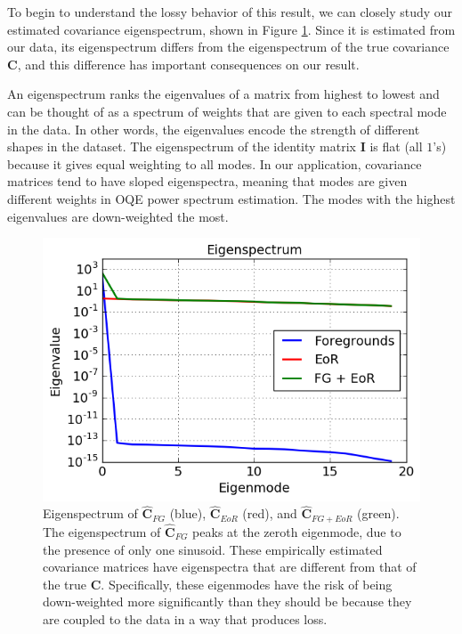 \documentclass[preprint2,numberedappendix,tighten]{aastex6}  %
\begin{document}
To begin to understand the lossy behavior of this result, we can closely study our estimated covariance eigenspectrum, shown in Figure \ref{fig:toy_sigloss2}. Since it is estimated from our data, its eigenspectrum differs from the eigenspectrum of the true covariance $\textbf{C}$, and this difference has important consequences on our result. 

An eigenspectrum ranks the eigenvalues of a matrix from 
highest to lowest and can be thought of as a spectrum of weights that are given to each spectral mode in the data. In other 
words, the eigenvalues encode the strength of different shapes in the dataset. The eigenspectrum of the identity matrix $
\textbf{I}$ is flat (all $1$'s) because it gives equal weighting to all modes. In our application, covariance matrices tend to have sloped eigenspectra, meaning that modes are given different weights in OQE power spectrum estimation. The modes with the highest eigenvalues are 
down-weighted the most. 

\begin{figure}
	\centering
	\includegraphics[trim={0cm 0cm 0cm 0cm},clip,width=\columnwidth]{plots/toy_sigloss2.png}
	\caption{Eigenspectrum of $\widehat{\textbf{C}}_{FG}$ (blue), $\widehat{\textbf{C}}_{EoR}$ (red), and $\widehat{\textbf{C}}_{FG+EoR}$ 
(green). The eigenspectrum of $\widehat{\textbf{C}}_{FG}$ peaks at the zeroth eigenmode, due to the presence of only one 
sinusoid. These empirically estimated covariance matrices have eigenspectra that are different from that of the true $\textbf{C}$. Specifically, these eigenmodes have the risk of being down-weighted more significantly than they should be because they are coupled to the data in a way that produces loss.}
	\label{fig:toy_sigloss2}
\end{figure}
\end{document}
